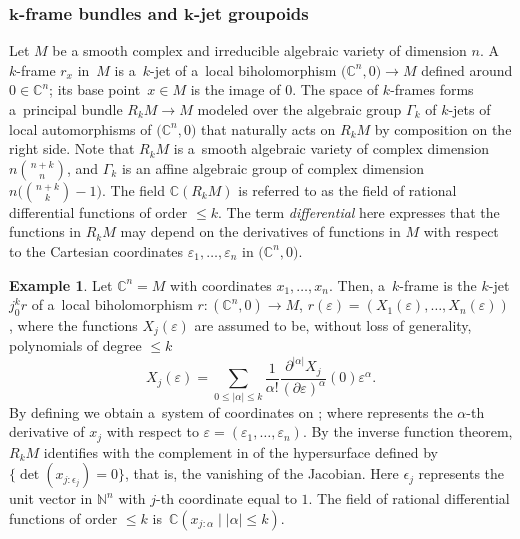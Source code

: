 \documentclass[10pt,a4paper]{amsart}
\numberwithin{equation}{section}
\theoremstyle{definition}
\newtheorem{Example}[Theorem]{Example}
\begin{document}
\subsubsection[k-frame bundles and k-jet groupoids]{$\boldsymbol{k}$-frame bundles and $\boldsymbol{k}$-jet groupoids}
Let $M$ be a smooth complex and irreducible algebraic variety of dimension $n$. A~$k$-frame $r_x$ in~$M$ is a~$k$-jet of a~local biholomorphism $\bigl(\mathbb C^n,0\bigr)\to M$ defined around $0\in \mathbb C^n$; its base point~${x\in M}$ is the image of $0$. The space of $k$-frames forms a~principal bundle $R_kM\to M$ modeled over the algebraic group $\Gamma_k$ of $k$-jets of local automorphisms of $\bigl(\mathbb C^n,0\bigr)$ that naturally acts on $R_kM$ by composition on the right side. Note that $R_kM$ is a~smooth algebraic variety of complex dimension $n\binom{n+k}{n}$, and $\Gamma_k$ is an affine algebraic group of complex dimension $n\big(\binom{n+k}{k} -1 \big)$. The field \(\mathbb{C}(R_k M)\) is referred to as the field of rational differential functions of order $\leq k$. The term \emph{differential} here expresses that the functions in $R_kM$ may depend on the derivatives of functions in $M$ with respect to the Cartesian coordinates $\varepsilon_1, \dots, \varepsilon_n$ in $\bigl(\mathbb C^n,0\bigr)$.

\begin{Example}\label{ex_1}
Let $\mathbb C^n = M$ with coordinates $x_1, \dots, x_n$. Then, a~$k$-frame is the $k$-jet $j_0^kr$ of a~local {biholomorphism} $r\colon(\mathbb C^n,0)\to M$, $r(\varepsilon) = (X_1(\varepsilon), \dots, X_n(\varepsilon))$, where the functions $X_j(\varepsilon)$ are assumed to be, without loss of generality, polynomials of {degree} $\leq k$
\[X_j(\varepsilon) = \sum_{0\leq|\alpha|\leq k}\frac{1}{\alpha!}\frac{\partial^{|\alpha|}X_j}{(\partial \varepsilon)^\alpha}(0)\varepsilon^\alpha.
\]
By defining 
we obtain a~system of  coordinates  on ; where  represents the $\alpha$-th derivative of $x_j$ with respect to
$\varepsilon = (\varepsilon_1,\dots,\varepsilon_n)$.
By the inverse function theorem, $R_kM$ identifies with the complement in  of the hypersurface defined by $\{\det\left( x_{j:\epsilon_j} \right)= 0\}$, that is, the vanishing of the Jacobian. Here $\epsilon_j$ represents the unit vector in $\mathbb N^n$ with $j$-th coordinate equal to $1$. The field of rational differential functions of order $\leq k$ is~${\mathbb C(x_{j:\alpha}\mid |\alpha|\leq k)}$.
\end{Example}
\end{document}
